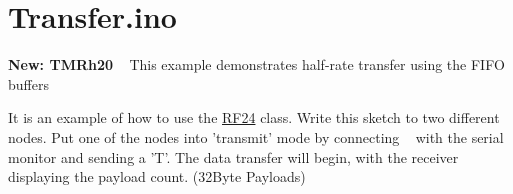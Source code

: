 \hypertarget{_transfer_8ino-example}{\section{Transfer.\+ino}
}
{\bfseries New\+: T\+M\+Rh20 }~\newline
 This example demonstrates half-\/rate transfer using the F\+I\+F\+O buffers~\newline


It is an example of how to use the \hyperlink{class_r_f24}{R\+F24} class. Write this sketch to two different nodes. Put one of the nodes into 'transmit' mode by connecting ~\newline
 with the serial monitor and sending a 'T'. The data transfer will begin, with the receiver displaying the payload count. (32\+Byte Payloads) ~\newline



\begin{DoxyCodeInclude}
\end{DoxyCodeInclude}
 